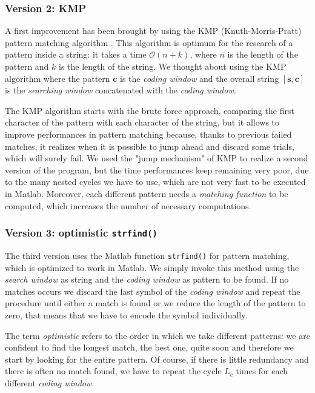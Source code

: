 \subsubsection{Version 2: KMP}
A first improvement has been brought by using the KMP (Knuth-Morris-Pratt) pattern matching algorithm \cite{knuth1}. This algorithm is optimum for the research of a pattern inside a string: it takes a time $\mathcal{O}(n + k)$, where $n$ is the length of the pattern and $k$ is the length of the string. We thought about using the KMP algorithm where the pattern $\mathbf{c}$ is the \textit{coding window} and the overall string $[\mathbf{s}, \mathbf{c}]$ is the \textit{searching window} concatenated with the \textit{coding window}.

The KMP algorithm starts with the brute force approach, comparing the first character of the pattern with each character of the string, but it allows to improve performances in pattern matching because, thanks to previous failed matches, it realizes when it is possible to jump ahead and discard some trials, which will surely fail. We used the "jump mechanism" of KMP to realize a second version of the program, but the time performances keep remaining very poor, due to the many nested cycles we have to use, which are not very fast to be executed in Matlab. Moreover, each different pattern needs a \textit{matching function} to be computed, which increases the number of necessary computations.

\subsubsection{Version 3: optimistic \texttt{strfind()}}
The third version uses the Matlab function \texttt{strfind()} for pattern matching, which is optimized to work in Matlab. We simply invoke this method using the \textit{search window} as string and the \textit{coding window} as pattern to be found. If no matches occurs we discard the last symbol of the \textit{coding window} and repeat the procedure until either a match is found or we reduce the length of the pattern to zero, that means that we have to encode the symbol individually.

The term \textit{optimistic} refers to the order in which we take different patterns: we are confident to find the longest match, the best one, quite soon and therefore we start by looking for the entire pattern. Of course, if there is little redundancy and there is often no match found, we have to repeat the cycle $L_c$ times for each different \textit{coding window}.

